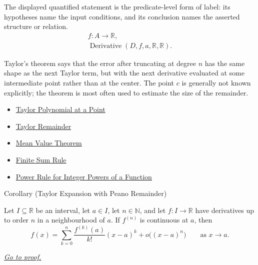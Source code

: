 \begin{remark*}
The displayed quantified statement is the predicate-level form of label: its hypotheses name the input conditions, and its conclusion names the asserted structure or relation.
\[
\begin{aligned}
  f\colon A\to\mathbb{R},\\
  \operatorname{Derivative}(D,f,a,\mathbb{R},\mathbb{R}).
\end{aligned}
\]
\end{remark*}

\begin{remark*}[Interpretation]
Taylor's theorem says that the error after truncating at degree $n$ has the
same shape as the next Taylor term, but with the next derivative evaluated at
some intermediate point rather than at the center. The point $c$ is generally
not known explicitly; the theorem is most often used to estimate the size of
the remainder.
\end{remark*}

\begin{dependencies}
\begin{itemize}
  \item \hyperref[def:taylor-polynomial-at-a-point]{Taylor Polynomial at a Point}
  \item \hyperref[def:taylor-remainder]{Taylor Remainder}
  \item \hyperref[thm:mean-value-theorem]{Mean Value Theorem}
  \item \hyperref[cor:finite-sum-rule]{Finite Sum Rule}
  \item \hyperref[cor:power-rule-special-case]{Power Rule for Integer Powers of a Function}
\end{itemize}
\end{dependencies}


\begin{corollarybox}{Corollary (Taylor Expansion with Peano Remainder)}
\begin{corollary}
\label{cor:taylor-expansion-peano-remainder}
Let $I\subseteq\mathbb{R}$ be an interval, let $a\in I$, let
$n\in\mathbb{N}$, and let $f:I\to\mathbb{R}$ have derivatives up to order
$n$ in a neighbourhood of $a$. If $f^{(n)}$ is continuous at $a$, then
\[
  f(x)
  =
  \sum_{k=0}^{n}\frac{f^{(k)}(a)}{k!}(x-a)^k
  +
  o\bigl((x-a)^n\bigr)
  \qquad\text{as }x\to a.
\]

\smallskip
\noindent
\hyperref[prf:taylor-expansion-peano-remainder]{\textit{Go to proof.}}
\end{corollary}
\end{corollarybox}

